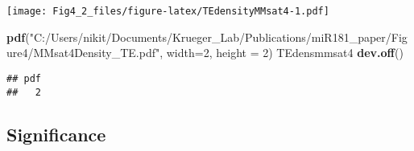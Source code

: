 \documentclass[
]{article}
\newenvironment{Shaded}{\begin{snugshade}}{\end{snugshade}}
\newcommand{\AttributeTok}[1]{\textcolor[rgb]{0.13,0.29,0.53}{#1}}
\newcommand{\DecValTok}[1]{\textcolor[rgb]{0.00,0.00,0.81}{#1}}
\newcommand{\FunctionTok}[1]{\textcolor[rgb]{0.13,0.29,0.53}{\textbf{#1}}}
\newcommand{\NormalTok}[1]{#1}
\newcommand{\StringTok}[1]{\textcolor[rgb]{0.31,0.60,0.02}{#1}}
\begin{document}
\texttt{[image: Fig4\_2\_files/figure-latex/TEdensityMMsat4-1.pdf]}

\begin{Shaded}
\begin{Highlighting}[]
\FunctionTok{pdf}\NormalTok{(}\StringTok{"C:/Users/nikit/Documents/Krueger\_Lab/Publications/miR181\_paper/Figure4/MMsat4Density\_TE.pdf"}\NormalTok{, }\AttributeTok{width=}\DecValTok{2}\NormalTok{, }\AttributeTok{height =} \DecValTok{2}\NormalTok{)}
\NormalTok{TEdensmmsat4}
\FunctionTok{dev.off}\NormalTok{()}
\end{Highlighting}
\end{Shaded}

\begin{verbatim}
## pdf 
##   2
\end{verbatim}

\hypertarget{significance-7}{%
\subsection{Significance}\label{significance-7}}
\end{document}
